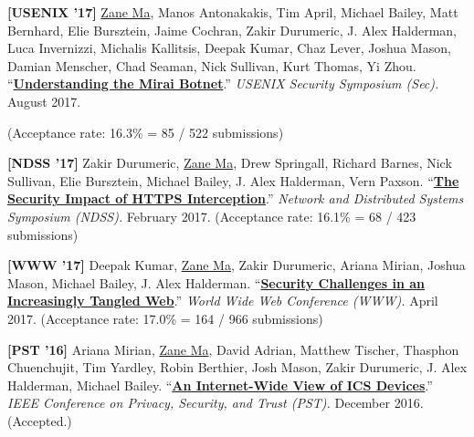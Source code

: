 \documentclass[10pt,singlecolumn]{article} %
\begin{document}
\begin{etaremune}

\item \textbf{[USENIX '17]}
\underline{Zane Ma}, Manos Antonakakis, Tim April, Michael Bailey, Matt Bernhard, Elie Bursztein, Jaime Cochran, Zakir Durumeric, J. Alex Halderman, Luca Invernizzi, Michalis Kallitsis, Deepak Kumar, Chaz Lever, Joshua Mason, Damian Menscher, Chad Seaman, Nick Sullivan, Kurt Thomas, Yi Zhou.
``\textbf{\href{https://zanema.com/papers/usenix17_mirai.pdf}{Understanding the Mirai Botnet}}.''
\emph{USENIX Security Symposium (Sec).} August 2017.

(Acceptance rate: 16.3\% = 85 / 522 submissions)
\vspace{6pt}


\item \textbf{[NDSS '17]}
Zakir Durumeric, \underline{Zane Ma}, Drew Springall, Richard Barnes, Nick Sullivan, Elie Bursztein, Michael Bailey, J. Alex Halderman, Vern Paxson.
``\textbf{\href{https://zanema.com/papers/ndss17_interception.pdf}{The Security Impact of HTTPS Interception}}.''
\emph{Network and Distributed Systems Symposium (NDSS).} February 2017.
(Acceptance rate: 16.1\% = 68 / 423 submissions)
\vspace{6pt}


\item \textbf{[WWW '17]}
Deepak Kumar, \underline{Zane Ma}, Zakir Durumeric, Ariana Mirian, Joshua Mason, Michael Bailey, J. Alex Halderman.
``\textbf{\href{https://zanema.com/papers/www17_tangled.pdf}{Security Challenges in an Increasingly Tangled Web}}.''
\emph{World Wide Web Conference (WWW).} April 2017.
(Acceptance rate: 17.0\% = 164 / 966 submissions)
\vspace{6pt}


\item \textbf{[PST '16]}
Ariana Mirian, \underline{Zane Ma}, David Adrian, Matthew Tischer, Thasphon Chuenchujit, Tim Yardley, Robin Berthier, Josh Mason, Zakir Durumeric, J. Alex Halderman, Michael Bailey.
``\textbf{\href{https://zanema.com/papers/pst16_ics.pdf}{An Internet-Wide View of ICS Devices}}.''
\emph{IEEE Conference on Privacy, Security, and Trust (PST).} December 2016. (Accepted.)
\vspace{6pt}

\end{etaremune}
\end{document}
